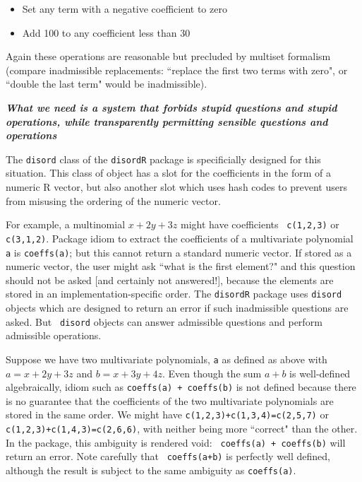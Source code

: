 \documentclass{article}
\begin{document}
\begin{itemize}
\item Set any term with a negative coefficient to zero
\item Add 100 to any coefficient less than 30
\end{itemize}

Again these operations are reasonable but precluded by multiset
formalism (compare inadmissible replacements: ``replace the first two
terms with zero", or ``double the last term" would be inadmissible).

{\bf\em\Large What we need is a system that forbids stupid questions
and stupid operations, while transparently permitting sensible
questions and operations}

The {\tt disord} class of the {\tt disordR} package is specificially
designed for this situation.  This class of object has a slot for the
coefficients in the form of a numeric R vector, but also another slot
which uses hash codes to prevent users from misusing the ordering of
the numeric vector.
   
For example, a multinomial $x+2y+3z$ might have coefficients {\tt
c(1,2,3)} or {\tt c(3,1,2)}.  Package idiom to extract the
coefficients of a multivariate polynomial {\tt a} is {\tt coeffs(a)};
but this cannot return a standard numeric vector.  If stored as a
numeric vector, the user might ask ``what is the first element?" and
this question should not be asked [and certainly not answered!],
because the elements are stored in an implementation-specific order.
The {\tt disordR} package uses {\tt disord} objects which are designed
to return an error if such inadmissible questions are asked.  But {\tt
disord} objects can answer admissible questions and perform admissible
operations.

Suppose we have two multivariate polynomials, {\tt a} as defined as
above with $a=x+2y+3z$ and $b=x+3y+4z$.  Even though the sum $a+b$ is
well-defined algebraically, idiom such as {\tt coeffs(a) + coeffs(b)}
is not defined because there is no guarantee that the coefficients of
the two multivariate polynomials are stored in the same order.  We
might have {\tt c(1,2,3)+c(1,3,4)=c(2,5,7)} or {\tt
c(1,2,3)+c(1,4,3)=c(2,6,6)}, with neither being more ``correct" than
the other.  In the package, this ambiguity is rendered void: {\tt
coeffs(a) + coeffs(b)} will return an error.  Note carefully that {\tt
coeffs(a+b)} is perfectly well defined, although the result is subject
to the same ambiguity as {\tt coeffs(a)}.
\end{document}
